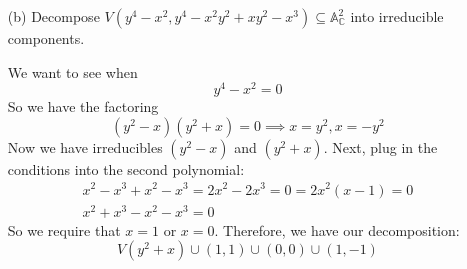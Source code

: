 \documentclass{article}
\begin{document}
\begin{itemize}
        \item [(b)] Decompose $V(y^{4} - x^{2}, y^{4} - x^{2}y^{2} + xy^{2} - x^{3}) \subseteq \mathbb{A}^{2}_{\mathbb{C}}$ into irreducible components. 
            \begin{answer}
                We want to see when 
                    \begin{equation*}
                        y^{4} - x^{2} = 0
                    \end{equation*}
                So we have the factoring
                    \begin{equation*}
                        (y^{2} - x)(y^{2} + x) = 0 \implies x = y^{2}, x = -y^{2}
                    \end{equation*}
                Now we have irreducibles $(y^{2} - x)$ and $(y^{2} + x)$. Next, plug in the conditions into the second polynomial:
                    \begin{align*}
                        x^{2} - x^{3} + x^{2} - x^{3} = 2x^{2} - 2x^{3} = 0 = 2x^{2}(x - 1) = 0 \\
                        x^{2} + x^{3} -x^{2} - x^{3} = 0
                    \end{align*}
                So we require that $x = 1$ or $x = 0$. Therefore, we have our decomposition:
                    \begin{equation*}
                        V(y^{2} + x) \cup (1, 1) \cup (0, 0) \cup (1, -1)
                    \end{equation*}
            \end{answer}
    \end{itemize}
\end{document}
